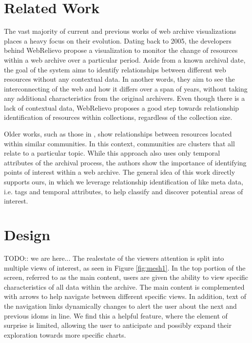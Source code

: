 \documentclass[10pt,journal,compsoc]{IEEEtran}
\begin{document}
\section{Related Work}
The vast majority of current and previous works of web archive visualizations places a heavy focus on their evolution. Dating back to 2005, the developers behind WebRelievo \cite{toyoda2005system} propose a visualization to monitor the change of resources within a web archive over a particular period. Aside from a known archival date, the goal of the system aims to identify relationships between different web resources without any contextual data. In another words, they aim to see the interconnecting of the web and how it differs over a span of years, without taking any additional characteristics from the original archivers. Even though there is a lack of contextual data, WebRelievo proposes a good step towards relationship identification of resources within collections, regardless of the collection size. \par

Older works, such as those in \cite{toyoda2003extracting}, show relationships between resources located within similar communities. In this context, communities are clusters that all relate to a particular topic. While this approach also uses only temporal attributes of the archival process, the authors show the importance of identifying points of interest within a web archive. The general idea of this work directly supports ours, in which we leverage relationship identification of like meta data, i.e. tags and temporal attributes, to help classify and discover potential areas of interest. \par


\section{Design}
TODO:: we are here...
The realestate of the viewers attention is split into multiple views of interest, as seen in Figure \ref{fig:mesh1}. In the top portion of the screen, referred to as the main content, users are given the ability to view specific characteristics of all data within the archive. The main content is complemented with arrows to help navigate between different specific views. In addition, text of the navigation links dynamically changes to alert the user about the next and previous idoms in line. We find this a helpful feature, where the element of surprise is limited, allowing the user to anticipate and possibly expand their exploration towards more specific charts. \par
\end{document}
